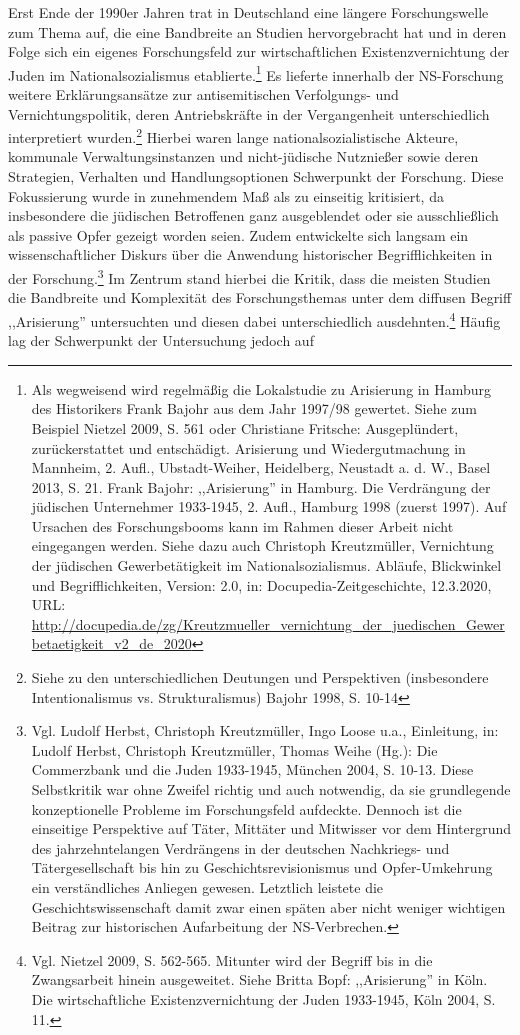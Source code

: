 Erst Ende der 1990er Jahren trat in Deutschland eine längere Forschungswelle zum Thema auf, die eine Bandbreite an Studien hervorgebracht hat und in deren Folge sich ein eigenes Forschungsfeld zur wirtschaftlichen Existenzvernichtung der Juden im Nationalsozialismus etablierte.\footnote{Als wegweisend wird regelmäßig die Lokalstudie zu Arisierung in Hamburg des Historikers Frank Bajohr aus dem Jahr 1997/98 gewertet. Siehe zum Beispiel Nietzel 2009, S. 561 oder Christiane Fritsche: Ausgeplündert, zurückerstattet und entschädigt. Arisierung und Wiedergutmachung in Mannheim, 2. Aufl., Ubstadt-Weiher, Heidelberg, Neustadt a. d. W., Basel 2013, S. 21. Frank Bajohr: ,,Arisierung'' in Hamburg. Die Verdrängung der jüdischen Unternehmer 1933-1945, 2. Aufl., Hamburg 1998 (zuerst 1997). Auf Ursachen des Forschungsbooms kann im Rahmen dieser Arbeit nicht eingegangen werden. Siehe dazu auch Christoph Kreutzmüller, Vernichtung der jüdischen Gewerbetätigkeit im Nationalsozialismus. Abläufe, Blickwinkel und Begrifflichkeiten, Version: 2.0, in: Docupedia-Zeitgeschichte, 12.3.2020, URL: \url{http://docupedia.de/zg/Kreutzmueller_vernichtung_der_juedischen_Gewerbetaetigkeit_v2_de_2020}} Es lieferte innerhalb der NS-Forschung weitere Erklärungsansätze zur antisemitischen Verfolgungs- und Vernichtungspolitik, deren Antriebskräfte in der Vergangenheit unterschiedlich interpretiert wurden.\footnote{Siehe zu den unterschiedlichen Deutungen und Perspektiven (insbesondere Intentionalismus vs. Strukturalismus) Bajohr 1998, S. 10-14} Hierbei waren lange nationalsozialistische Akteure, kommunale Verwaltungsinstanzen und nicht-jüdische Nutznießer sowie deren Strategien, Verhalten und Handlungsoptionen Schwerpunkt der Forschung. Diese Fokussierung wurde in zunehmendem Maß als zu einseitig kritisiert, da insbesondere die jüdischen Betroffenen ganz ausgeblendet oder sie ausschließlich als passive Opfer gezeigt worden seien. Zudem entwickelte sich langsam ein wissenschaftlicher Diskurs über die Anwendung historischer Begrifflichkeiten in der Forschung.\footnote{Vgl. Ludolf Herbst, Christoph Kreutzmüller, Ingo Loose u.a., Einleitung, in: Ludolf Herbst, Christoph Kreutzmüller, Thomas Weihe (Hg.): Die Commerzbank und die Juden 1933-1945, München 2004, S. 10-13. Diese Selbstkritik war ohne Zweifel richtig und auch notwendig, da sie grundlegende konzeptionelle Probleme im Forschungsfeld aufdeckte. Dennoch ist die einseitige Perspektive auf Täter, Mittäter und Mitwisser vor dem Hintergrund des jahrzehntelangen Verdrängens in der deutschen Nachkriegs- und Tätergesellschaft bis hin zu Geschichtsrevisionismus und Opfer-Umkehrung ein verständliches Anliegen gewesen. Letztlich leistete die Geschichtswissenschaft damit zwar einen späten aber nicht weniger wichtigen Beitrag zur historischen Aufarbeitung der NS-Verbrechen.} Im Zentrum stand hierbei die Kritik, dass die meisten Studien die Bandbreite und Komplexität des Forschungsthemas unter dem diffusen Begriff ,,Arisierung'' untersuchten und diesen dabei unterschiedlich ausdehnten.\footnote{Vgl. Nietzel 2009, S. 562-565. Mitunter wird der Begriff bis in die Zwangsarbeit hinein ausgeweitet. Siehe Britta Bopf: ,,Arisierung'' in Köln. Die wirtschaftliche Existenzvernichtung der Juden 1933-1945, Köln 2004, S. 11.} Häufig lag der Schwerpunkt der Untersuchung jedoch auf 